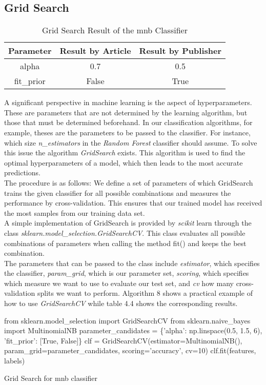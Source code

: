 \documentclass[a4paper, 11pt,titlepage,oneside,openany]{book}
\begin{document}
\subsection{Grid Search}
\begin{table}[h]
	\centering
		\begin{tabular}{c|c|c}
			\toprule
			Parameter & Result by Article & Result by Publisher \\
			\midrule
			alpha & 0.7 & 0.5  \\
			fit\_prior & False & True \\
			\bottomrule
		\end{tabular}
		\caption{Grid Search Result of the \gls{mnb} Classifier}
\end{table}
\noindent A significant perspective in machine learning is the aspect of hyperparameters. These are parameters that are not determined by the learning algorithm, but those that must be determined beforehand. In our classification algorithms, for example, theses are the parameters to be passed to the classifier. For instance, which size \textit{n\_estimators} in the \textit{Random Forest} classifier should assume. To solve this issue the algorithm \textit{GridSearch} exists. This algorithm is used to find the optimal hyperparameters of a model, which then leads to the most accurate predictions. \\
\noindent The procedure is as follows: We define a set of parameters of which GridSearch trains the given classifier for all possible combinations and measures the performance by cross-validation. This ensures that our trained model has received the most samples from our training data set. \\
\noindent A simple implementation of GridSearch is provided by \textit{scikit} learn through the class \textit{sklearn.model\_selection.GridSearchCV}. This class evaluates all possible combinations of parameters when calling the method fit() and keeps the best combination. \\
\noindent The parameters that can be passed to the class include \textit{estimator}, which specifies the classifier, \textit{param\_grid}, which is our parameter set, \textit{scoring}, which specifies which measure we want to use to evaluate our test set, and \textit{cv} how many cross-validation splits we want to perform. Algorithm 8 shows a practical example of how to use \textit{GridSearchCV} while table 4.4 shows the corresponding results. 
\begin{algorithm}[H]
	\DontPrintSemicolon
	from sklearn.model\_selection import GridSearchCV\;
	from sklearn.naive\_bayes import MultinomialNB\;
	\BlankLine
	    parameter\_candidates = \{'alpha': np.linspace(0.5, 1.5, 6), 'fit\_prior': [True, False]\}\;
	    clf = GridSearchCV(estimator=MultinomialNB(), param\_grid=parameter\_candidates, scoring='accuracy', cv=10)\;
	clf.fit(features, labels)\;
	\caption{Grid Search for \gls{mnb} classifier}
\end{algorithm}
\end{document}
